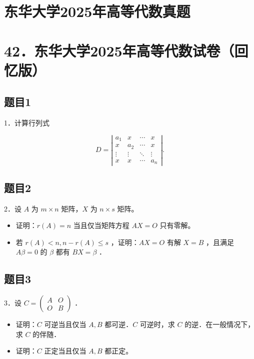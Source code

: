\documentclass{article}
\begin{document}
\section*{东华大学2025年高等代数真题}
\section*{42．东华大学2025年高等代数试卷（回忆版）}

\subsection{题目1}
1．计算行列式

\[
D=\left|\begin{array}{cccc}
a_{1} & x & \cdots & x \\
x & a_{2} & \cdots & x \\
\vdots & \vdots & \ddots & \vdots \\
x & x & \cdots & a_{n}
\end{array}\right| .
\]

\subsection{题目2}
2．设 \(A\) 为 \(m \times n\) 矩阵，\(X\) 为 \(n \times s\) 矩阵。

\begin{itemize}
  \item[（1）] 证明：\(r(A)=n\) 当且仅当矩阵方程 \(A X=O\) 只有零解。
  \item[（2）] 若 \(r(A)<n, n-r(A) \leq s\) ，证明：\(A X=O\) 有解 \(X=B\) ，且满足 \(A \beta=0\) 的 \(\beta\) 都有 \(B X=\beta\) ．
\end{itemize}

\subsection{题目3}
3．设 \(C=\left(\begin{array}{cc}A & O \\ O & B\end{array}\right)\) ．

\begin{itemize}
  \item[（1）] 证明：\(C\) 可逆当且仅当 \(A, B\) 都可逆．\(C\) 可逆时，求 \(C\) 的逆．在一般情况下，求 \(C\) 的伴随．
  \item[（2）] 证明：\(C\) 正定当且仅当 \(A, B\) 都正定。
\end{itemize}
\end{document}
